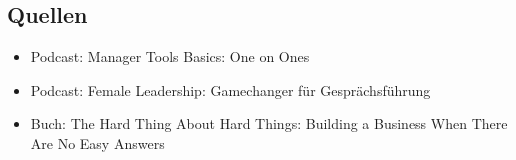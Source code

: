 \subsection{Quellen}

\begin{itemize}
 \item Podcast: Manager Tools Basics: One on Ones \cite[04.\,07.\,2005 bis 11.\,07.\,2005]{manager-tools-basics}
 \item Podcast: Female Leadership: Gamechanger für Gesprächsführung \cite[Folge 15]{female-leadership-gespraechsfuehrung}
 \item Buch: The Hard Thing About Hard Things: Building a Business When There Are No Easy Answers \cite{the-hard-thing-about-hard-things}
\end{itemize}
